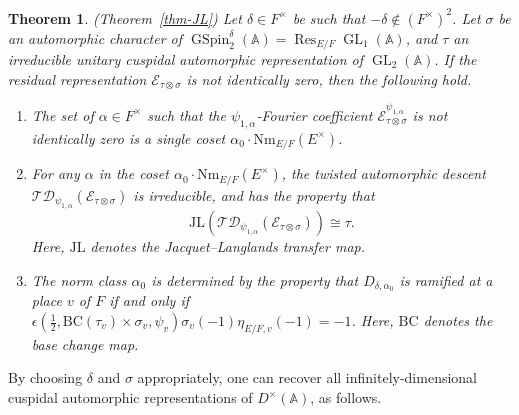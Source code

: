 \documentclass[12pt]{amsart}
\newcommand{\A}{\mathbb{A}}
\newcommand{\Res}{\operatorname{Res}}
\newcommand{\JL}{\mathrm{JL}}
\newcommand{\BC}{\mathrm{BC}}
\newcommand{\TD}{\mathcal{TD}}
\newcommand{\CE}{{\mathcal{E}}}
\newtheorem{theorem}{Theorem}[section]
\theoremstyle{remark}
\DeclareMathOperator{\GL}{GL}
\DeclareMathOperator{\GSpin}{GSpin}
\begin{document}
\begin{theorem}(Theorem~\ref{thm-JL})
\label{Intro-thm-JL}
Let $\delta\in F^\times$ be such that $-\delta\not\in (F^\times)^2$. Let $\sigma$ be an automorphic character of $\GSpin_2^{\delta}(\A)=\Res_{E/F} \GL_1(\A)$, and $\tau$ an irreducible unitary cuspidal automorphic representation of $\GL_{2}(\A)$. 
If the residual representation $\CE_{\tau\otimes\sigma}$ is not identically zero, then the following hold. 
\begin{enumerate}
\item  The set of $\alpha\in F^\times$ such that the $\psi_{1,\alpha}$-Fourier coefficient $\CE^{\psi_{1,\alpha}}_{\tau\otimes\sigma}$ is not identically zero is a single coset $\alpha_0\cdot \mathrm{Nm}_{E/F} (E^\times)$.
\item For any $\alpha$ in the coset $\alpha_0\cdot \mathrm{Nm}_{E/F} (E^\times)$, the twisted automorphic descent $\TD_{\psi_{1,\alpha}} (\CE_{\tau\otimes\sigma})$ is irreducible, and has the property that 
\begin{equation*}
\JL(\TD_{\psi_{1,\alpha}} (\CE_{\tau\otimes\sigma}) ) \cong \tau. 
\end{equation*}
Here, $\JL$ denotes the Jacquet--Langlands transfer map. 

\item The norm class $\alpha_0$ is determined by the property that  $D_{\delta, \alpha_0}$ is ramified at a place $v$ of $F$ if and only if $\epsilon(\frac{1}{2}, \BC( \tau_v)\times \sigma_v, \psi_v) \sigma_v(-1) \eta_{E/F,v}(-1)=-1$. Here, $\BC$ denotes the base change map.
\end{enumerate}
\end{theorem}

By choosing $\delta$ and $\sigma$ appropriately, one can recover all infinitely-dimensional cuspidal automorphic representations of $D^\times(\A)$, as follows. 
\end{document}
